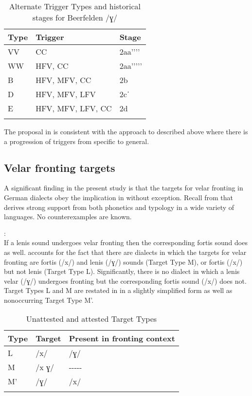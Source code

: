 \begin{table}
\caption{Alternate Trigger Types and historical stages for Beerfelden /ɣ/\label{tab:12.33}}
\begin{tabular}{lll}
\lsptoprule
Type & Trigger & Stage\\\midrule
VV & CC & 2aa'{}'{}'{}'\\
WW & HFV, CC & 2aa'{}'{}'{}'{}'\\
B & HFV, MFV, CC & 2b\\
D & HFV, MFV, LFV & 2cˈ\\
E & HFV, MFV, LFV, CC & 2d\\
\lspbottomrule
\end{tabular}
\end{table}

The proposal in  is consistent with the approach to  described above where there is a progression of triggers from specific to general.

\subsection{Velar fronting targets}\label{sec:12.7.2}\largerpage[2]

A significant finding in the present study is that the targets for velar fronting in German dialects obey the implication in  without exception. Recall from  that  derives strong support from both phonetics and typology in a wide variety of languages. No counterexamples are known.

\eanoraggedright%
\label{ex:12:22}
\textsc{}:\\
If a lenis sound undergoes velar fronting then the corresponding fortis sound does as well.
\z
{} accounts for the fact that there are dialects in which the targets for velar fronting are fortis (/x/) and lenis (/ɣ/) sounds (Target Type M), or fortis (/x/) but not lenis (Target Type L). Significantly, there is no dialect in which a lenis velar (/ɣ/) undergoes fronting but the corresponding fortis sound (/x/) does not. Target Types L and M are restated in  in a slightly simplified form as well as nonoccurring Target Type M{}'.
 

\begin{table}
\caption{Unattested and attested Target Types\label{tab:12.34}}
\begin{tabular}{lll}
\lsptoprule
Type & Target & Present in fronting context\\\midrule
L & /x/ & /ɣ/\\
M & /x ɣ/ & {}-{}-{}-{}-{}-\\
M' & /ɣ/ & /x/\\
\lspbottomrule
\end{tabular}
\end{table}

